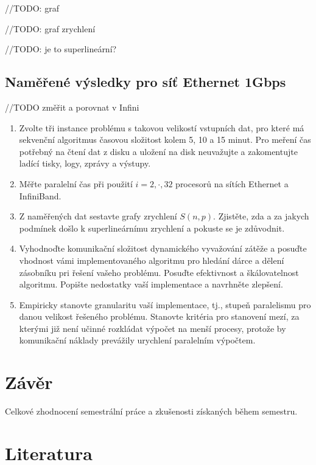 \documentclass[12pt]{article}
\begin{document}
//TODO: graf

//TODO: graf zrychlení

//TODO: je to superlineární?




\subsection{Naměřené výsledky pro síť Ethernet 1Gbps}

//TODO změřit a porovnat v Infini




\begin{enumerate}
\item Zvolte tři instance problému s takovou velikostí vstupních dat, pro které má
sekvenční algoritmus časovou složitost kolem 5, 10 a 15 minut. Pro
meření čas potřebný na čtení dat z disku a uložení na disk
neuvažujte a zakomentujte ladící tisky, logy, zprávy a výstupy.
\item Měřte paralelní čas při použití $i=2,\cdot,32$ procesorů na sítích Ethernet a InfiniBand.
\item Z naměřených dat sestavte grafy zrychlení $S(n,p)$. Zjistěte, zda a za jakych podmínek
došlo k superlineárnímu zrychlení a pokuste se je zdůvodnit.
\item Vyhodnoďte komunikační složitost dynamického vyvažování zátěže a posuďte
vhodnost vámi implementovaného algoritmu pro hledání dárce a dělení
zásobníku pri řešení vašeho problému. Posuďte efektivnost a
škálovatelnost algoritmu. Popište nedostatky vaší implementace a
navrhněte zlepšení.
\item Empiricky stanovte
granularitu vaší implementace, tj., stupeň paralelismu pro danou
velikost řešeného problému. Stanovte kritéria pro stanovení mezí, za
kterými již není učinné rozkládat výpočet na menší procesy, protože
by komunikační náklady prevážily urychlení paralelním výpočtem.

\end{enumerate}

\section{Závěr}

Celkové zhodnocení semestrální práce a zkušenosti získaných během
semestru.

\section{Literatura}
\end{document}

